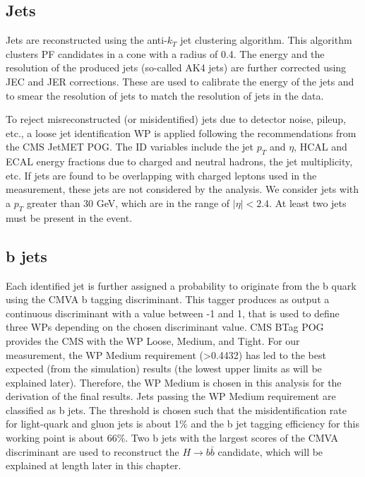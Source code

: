 \subsection{Jets}\label{sec:jets}
Jets are reconstructed using the anti-$k_T$ jet clustering algorithm. This algorithm clusters PF candidates in a cone with a radius of 0.4. The energy and the resolution of the produced jets (so-called AK4 jets) are further corrected using JEC and JER corrections. These are used to calibrate the energy of the jets and to smear the resolution of jets to match the resolution of jets in the data. 

To reject misreconstructed (or misidentified) jets due to detector noise, pileup, etc., a loose jet identification WP is applied following the recommendations from the CMS JetMET POG. The ID variables include the jet $p_T$ and $\eta$, HCAL and ECAL energy fractions due to charged and neutral hadrons, the jet multiplicity, etc. If jets are found to be overlapping with charged leptons used in the measurement, these jets are not considered by the analysis. We consider jets with a $p_T$ greater than 30 GeV, which are in the range of $|\eta| < 2.4$. At least two jets must be present in the event. 

\subsection{b jets}\label{sec:bjets}
Each identified jet is further assigned a probability to originate from the b quark using the CMVA b tagging discriminant. This tagger produces as output a continuous discriminant with a value between -1 and 1, that is used to define three WPs depending on the chosen discriminant value. CMS BTag POG provides the CMS with the WP Loose, Medium, and Tight. For our measurement, the WP Medium requirement (>0.4432) has led to the best expected (from the simulation) results (the lowest upper limits as will be explained later). Therefore, the WP Medium is chosen in this analysis for the derivation of the final results. Jets passing the WP Medium requirement are classified as b jets. The threshold is chosen such that the misidentification rate for light-quark and gluon jets is about 1$\%$ and the b jet tagging efficiency for this working point is about 66$\%$. Two b jets with the largest scores of the CMVA discriminant are used to reconstruct the $H \to b\bar{b}$ candidate, which will be explained at length later in this chapter. 

